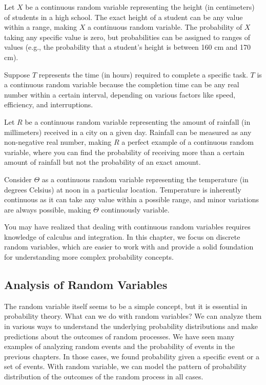 \begin{example}
Let \( X \) be a continuous random variable representing the height (in centimeters) 
of students in a high school. The exact height of a student can be any value within 
a range, making \( X \) a continuous random variable. The probability of \( X \) 
taking any specific value is zero, but probabilities can be assigned to ranges of 
values (e.g., the probability that a student's height is between 160 cm and 170 cm).
\end{example}

\begin{example}
Suppose \( T \) represents the time (in hours) required to complete a specific task. 
\( T \) is a continuous random variable because the completion time can be any 
real number within a certain interval, depending on various factors like speed, 
efficiency, and interruptions.
\end{example}

\begin{example}
Let \( R \) be a continuous random variable representing the amount of rainfall 
(in millimeters) received in a city on a given day. Rainfall can be measured as 
any non-negative real number, making \( R \) a perfect example of a continuous 
random variable, where you can find the probability of receiving more than a 
certain amount of rainfall but not the probability of an exact amount.
\end{example}

\begin{example}
Consider \( \Theta \) as a continuous random variable representing the temperature 
(in degrees Celsius) at noon in a particular location. Temperature is inherently 
continuous as it can take any value within a possible range, and minor variations 
are always possible, making \( \Theta \) continuously variable.
\end{example}

You may have realized that dealing with continuous random variables requires knowledge of calculus and integration.
In this chapter, we focus on discrete random variables, which are easier to work with and provide a solid foundation for understanding more complex probability concepts.
\subsection{Analysis of Random Variables}
The random variable itself seems to be a simple concept, but it is essential in probability theory.
What can we do with random variables? We can analyze them in various ways to understand the underlying probability distributions and make predictions about the outcomes of random processes.
We have seen many examples of analyzing random events and the probability of events in the previous chapters.
In those cases, we found probability given a specific event or a set of events.
With random variable, we can model the pattern of probability distribution of the outcomes of the random process
in all cases.

